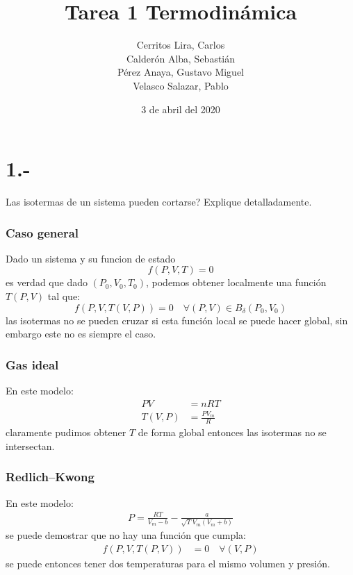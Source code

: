 \documentclass{article}
\title{Tarea 1 Termodinámica}
\author{Cerritos Lira, Carlos\\
Calderón Alba, Sebastián \\ Pérez Anaya, Gustavo Miguel\\ 
Velasco Salazar, Pablo}
\date{3 de abril del 2020}
\begin{document}
\maketitle
\section*{1.-}
Las isotermas de un sistema pueden cortarse? Explique detalladamente.
\begin{tcolorbox}[breakable]
    \subsubsection*{Caso general}
    Dado un sistema  y su funcion de estado 
    \[ f(P,V,T) = 0 \]
    es verdad que dado $(P_0,V_0,T_0)$, podemos obtener localmente una función 
    $T(P,V)$ tal que:
    \[ f(P,V,T(V,P)) = 0 \quad \forall (P,V) \in B_{\delta}(P_0,V_0) \] 
    las isotermas no se pueden cruzar si esta función local se puede 
    hacer global, sin embargo este no es siempre el caso.
    \subsubsection*{Gas ideal}
    En este modelo:
    \begin{align*}
        PV &= nRT \\
        T(V,P) &= \frac{PV_m}{R}   
    \end{align*}
    claramente pudimos obtener $T$ de forma global entonces las isotermas no se intersectan.

    \subsubsection*{Redlich–Kwong}  
    En este modelo:
    \begin{align*}
        P = \frac{RT}{V_m-b} - \frac{a}{\sqrt{T}V_m(V_m+b)}
    \end{align*}
    se puede demostrar que no hay una función que cumpla:
    \begin{align*}
        f(P,V,T(P,V)) &= 0 \quad \forall (V,P)
    \end{align*}
    se puede entonces tener dos temperaturas para el mismo volumen y presión. 
\end{tcolorbox}
\end{document}
